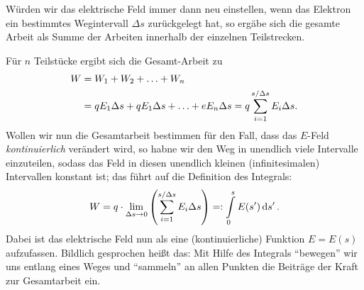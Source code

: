 Würden wir das elektrische Feld immer dann neu einstellen, wenn das Elektron ein bestimmtes Wegintervall $\Delta s$ zurückgelegt hat, so ergäbe sich die gesamte Arbeit als Summe der Arbeiten innerhalb der einzelnen Teilstrecken.
\begin{figure}[htp]
    \centering
\end{figure}
Für $n$ Teilstücke ergibt sich die Gesamt-Arbeit zu 
\begin{align}
    W &= W_1 + W_2 + \hdots + W_n \notag \\
      &= q E_1 \Delta s + q E_1 \Delta s + \hdots + e E_n \Delta s = q \sum_{i=1}^{s/\Delta s} E_i \Delta s.
\end{align}
Wollen wir nun die Gesamtarbeit bestimmen für den Fall, dass das $E$-Feld \emph{kontinuierlich} verändert wird, so habne wir den Weg in unendlich viele Intervalle einzuteilen, sodass das Feld in diesen unendlich kleinen (infinitesimalen) Intervallen konstant ist; das führt auf die Definition des Integrals: 
\begin{align}
    W = q \cdot \lim_{\Delta s \to 0} \qty(\sum_{i=1}^{s/\Delta s} E_i \Delta s) =: \int\limits_{0}^{s} E(s') \dd{s'}.
\end{align}
Dabei ist das elektrische Feld nun als eine (kontinuierliche) Funktion $E = E(s)$ aufzufassen. Bildlich gesprochen heißt das: Mit Hilfe des Integrals ``bewegen'' wir uns entlang eines Weges und ``sammeln'' an allen Punkten die Beiträge der Kraft zur Gesamtarbeit ein. 
